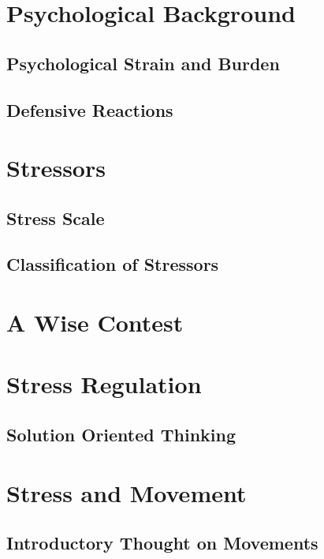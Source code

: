 \documentclass[../main.tex]{subfiles}
\begin{document}
\chapter{Psychological Background}
\section{Psychological Strain and Burden}


\section{Defensive Reactions}



\chapter{Stressors}
\section{Stress Scale}


\section{Classification of Stressors}
% 

\chapter{A Wise Contest}


\chapter{Stress Regulation}
\section{Solution Oriented Thinking}


\chapter{Stress and Movement}
\section{Introductory Thought on Movements}

\end{document}
